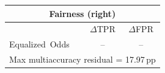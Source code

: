 \begin{tabular}{lcc}\toprule
\multicolumn{3}{c}{\textbf{Fairness (right)}}\\\midrule
& $\Delta$TPR & $\Delta$FPR \\\midrule
Equalized~Odds & -- & --\\\midrule
\multicolumn{3}{c}{Max multiaccuracy residual = 17.97\,pp}\\
\bottomrule\end{tabular}
